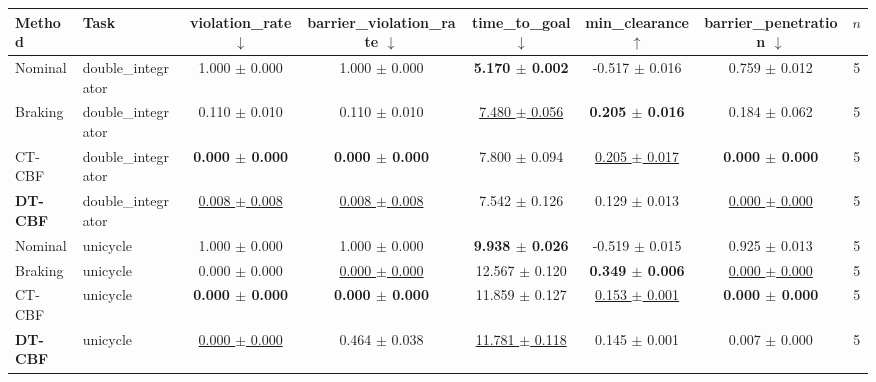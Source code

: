 \begin{tabular}{llcccccc}
\toprule
Method & Task & violation\_rate $\downarrow$ & barrier\_violation\_rate $\downarrow$ & time\_to\_goal $\downarrow$ & min\_clearance $\uparrow$ & barrier\_penetration $\downarrow$ & $n$ \\
\midrule
Nominal & double\_integrator & 1.000 $\pm$ 0.000 & 1.000 $\pm$ 0.000 & \textbf{5.170 $\pm$ 0.002} & -0.517 $\pm$ 0.016 & 0.759 $\pm$ 0.012 & 5 \\
Braking & double\_integrator & 0.110 $\pm$ 0.010 & 0.110 $\pm$ 0.010 & \underline{7.480 $\pm$ 0.056} & \textbf{0.205 $\pm$ 0.016} & 0.184 $\pm$ 0.062 & 5 \\
CT-CBF & double\_integrator & \textbf{0.000 $\pm$ 0.000} & \textbf{0.000 $\pm$ 0.000} & 7.800 $\pm$ 0.094 & \underline{0.205 $\pm$ 0.017} & \textbf{0.000 $\pm$ 0.000} & 5 \\
\textbf{DT-CBF} & double\_integrator & \underline{0.008 $\pm$ 0.008} & \underline{0.008 $\pm$ 0.008} & 7.542 $\pm$ 0.126 & 0.129 $\pm$ 0.013 & \underline{0.000 $\pm$ 0.000} & 5 \\
\midrule
Nominal & unicycle & 1.000 $\pm$ 0.000 & 1.000 $\pm$ 0.000 & \textbf{9.938 $\pm$ 0.026} & -0.519 $\pm$ 0.015 & 0.925 $\pm$ 0.013 & 5 \\
Braking & unicycle & 0.000 $\pm$ 0.000 & \underline{0.000 $\pm$ 0.000} & 12.567 $\pm$ 0.120 & \textbf{0.349 $\pm$ 0.006} & \underline{0.000 $\pm$ 0.000} & 5 \\
CT-CBF & unicycle & \textbf{0.000 $\pm$ 0.000} & \textbf{0.000 $\pm$ 0.000} & 11.859 $\pm$ 0.127 & \underline{0.153 $\pm$ 0.001} & \textbf{0.000 $\pm$ 0.000} & 5 \\
\textbf{DT-CBF} & unicycle & \underline{0.000 $\pm$ 0.000} & 0.464 $\pm$ 0.038 & \underline{11.781 $\pm$ 0.118} & 0.145 $\pm$ 0.001 & 0.007 $\pm$ 0.000 & 5 \\
\bottomrule
\end{tabular}
